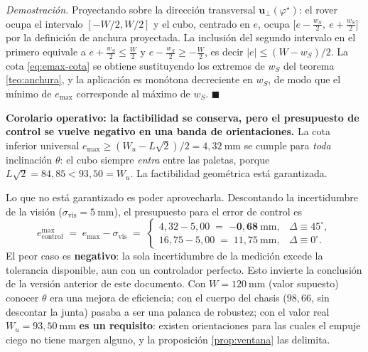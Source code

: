 \documentclass[11pt,a4paper]{article}
\theoremstyle{definition}
\newenvironment{demo}{\par\noindent\textit{Demostración.}\;}{\hfill$\blacksquare$\par\medskip}
\newcommand{\uu}{\mathbf{u}}
\newcommand{\grados}{^{\circ}}
\begin{document}
\begin{demo}
Proyectando sobre la dirección transversal $\uu_\perp(\varphi^\star)$: el rover ocupa el
intervalo $[-W/2, W/2]$ y el cubo, centrado en $e$, ocupa
$\big[e - \tfrac{w_S}{2},\ e + \tfrac{w_S}{2}\big]$ por la definición de anchura
proyectada. La inclusión del segundo intervalo en el primero equivale a
$e + \tfrac{w_S}{2}\le \tfrac{W}{2}$ y $e - \tfrac{w_S}{2} \ge -\tfrac{W}{2}$, es decir
$|e| \le (W-w_S)/2$. La cota \eqref{eq:emax-cota} se obtiene sustituyendo los extremos
de $w_S$ del teorema \ref{teo:anchura}, y la aplicación es monótona decreciente en
$w_S$, de modo que el mínimo de $e_{\max}$ corresponde al máximo de $w_S$.
\end{demo}

\begin{resultado}
\textbf{Corolario operativo: la factibilidad se conserva, pero el presupuesto de control
se vuelve negativo en una banda de orientaciones.} La cota inferior universal
$e_{\max} \ge (W_u - L\sqrt2)/2 = 4{,}32\ \mathrm{mm}$ se cumple para \emph{toda}
inclinación $\theta$: el cubo siempre \emph{entra} entre las paletas, porque
$L\sqrt2 = 84{,}85 < 93{,}50 = W_u$. La factibilidad geométrica está garantizada.

Lo que no está garantizado es poder aprovecharla. Descontando la incertidumbre de la
visión ($\sigma_{\mathrm{vis}} = 5\ \mathrm{mm}$), el presupuesto para el error de
control es
\[
  e^{\max}_{\mathrm{control}} \;=\; e_{\max} - \sigma_{\mathrm{vis}}
  \;=\;
  \begin{cases}
    4{,}32 - 5{,}00 \;=\; \mathbf{-0{,}68\ \mathrm{mm}}, & \Delta \equiv 45\grados,\\[3pt]
    16{,}75 - 5{,}00 \;=\; 11{,}75\ \mathrm{mm}, & \Delta \equiv 0\grados .
  \end{cases}
\]
El peor caso es \textbf{negativo}: la sola incertidumbre de la medición excede la
tolerancia disponible, aun con un controlador perfecto. Esto invierte la conclusión de
la versión anterior de este documento. Con $W = 120\ \mathrm{mm}$ (valor supuesto)
conocer $\theta$ era una mejora de eficiencia; con el cuerpo del chasis ($98{,}66$, sin
descontar la junta) pasaba a ser una
palanca de robustez; con el valor real $W_u = 93{,}50\ \mathrm{mm}$
\textbf{es un requisito}: existen orientaciones para las cuales el empuje ciego no tiene
margen alguno, y la proposición \ref{prop:ventana} las delimita.
\end{resultado}
\end{document}
